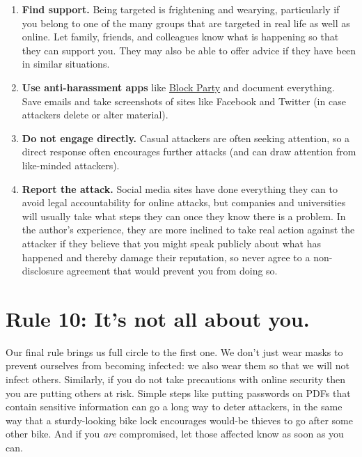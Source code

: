 \documentclass[10pt, letterpaper]{article}
\begin{document}
\begin{enumerate}
\item
  \textbf{Find support.} Being targeted is frightening and wearying,
  particularly if you belong to one of the many groups that are targeted in real
  life as well as online. Let family, friends, and colleagues know what is
  happening so that they can support you. They may also be able to offer advice
  if they have been in similar situations.

\item
  \textbf{Use anti-harassment apps}
  like \href{https://www.blockpartyapp.com/}{{Block Party}} and document
  everything. Save emails and take screenshots of sites like Facebook and
  Twitter (in case attackers delete or alter material).

\item
  \textbf{Do not engage directly.} Casual attackers are often seeking attention,
  so a direct response often encourages further attacks (and can draw attention
  from like-minded attackers).

\item
  \textbf{Report the attack.} Social media sites have done everything they can
  to avoid legal accountability for online attacks, but companies and
  universities will usually take what steps they can once they know there is a
  problem. In the author's experience, they are more inclined to take real
  action against the attacker if they believe that you might speak publicly
  about what has happened and thereby damage their reputation, so never agree to
  a non-disclosure agreement that would prevent you from doing so.
\end{enumerate}

\section*{Rule 10: It's not all about you.}

Our final rule brings us full circle to the first one. We don't just wear masks
to prevent ourselves from becoming infected: we also wear them so that we will
not infect others. Similarly, if you do not take precautions with online
security then you are putting others at risk.  Simple steps like putting
passwords on PDFs that contain sensitive information can go a long way to deter
attackers, in the same way that a sturdy-looking bike lock encourages would-be
thieves to go after some other bike. And if you \emph{are} compromised, let
those affected know as soon as you can.
\end{document}
